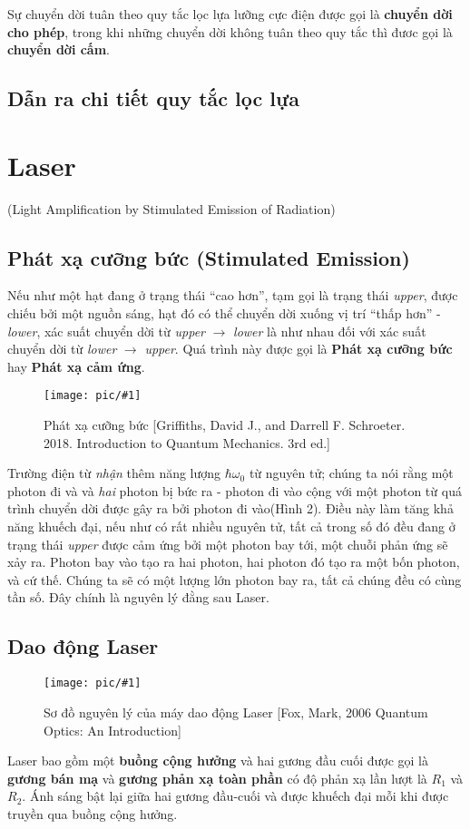\documentclass{article}
\newcommand{\image}[2]{
	\begin{figure}[h!]
		\centering
		\texttt{[image: pic/\#1]}
		\caption{#2}
	\end{figure}
}
\begin{document}
Sự chuyển dời tuân theo quy tắc lọc lựa lưỡng cực điện được gọi là \textbf{chuyển dời cho phép}, trong khi những chuyển dời không tuân theo quy tắc thì đươc gọi là \textbf{chuyển dời cấm}.

\subsection{Dẫn ra chi tiết quy tắc lọc lựa}

\section{Laser}(Light Amplification by
 Stimulated Emission of Radiation)
\subsection{Phát xạ cưỡng bức (Stimulated Emission)}
Nếu như một hạt đang ở trạng thái ``cao hơn'', tạm gọi là trạng thái \textit{upper}, được chiếu bởi một nguồn sáng, hạt đó có thể chuyển dời xuống vị trí ``thấp hơn'' - \textit{lower}, xác suất chuyển dời từ \textit{upper} $\rightarrow$ \textit{lower} là như nhau đối với xác suất chuyển dời từ \textit{lower} $\rightarrow$ \textit{upper}. Quá trình này được gọi là \textbf{Phát xạ cưỡng bức} hay \textbf{Phát xạ cảm ứng}.
\image{stimulatedemission.png}{Phát xạ cưỡng bức [Griffiths, David J., and Darrell F. Schroeter. 2018. Introduction to Quantum Mechanics. 3rd ed.]}

Trường điện từ \textit{nhận} thêm năng lượng $\hbar \omega_0$ từ nguyên tử; chúng ta nói rằng một photon đi và và \textit{hai} photon bị bức ra - photon đi vào cộng với một photon từ quá trình chuyển dời được gây ra bởi photon đi vào(Hình 2). Điều này làm tăng khả năng khuếch đại, nếu như có rất nhiều nguyên tử, tất cả trong số đó đều đang ở trạng thái \textit{upper} được cảm ứng bởi một photon bay tới, một chuỗi phản ứng sẽ xảy ra. Photon bay vào tạo ra hai photon, hai photon đó tạo ra một bốn photon, và cứ thế. Chúng ta sẽ có một lượng lớn photon bay ra, tất cả chúng đều có cùng tần số. Đây chính là nguyên lý đằng sau Laser.
\subsection{Dao động Laser}
\image{fig4.8.png}{Sơ đồ nguyên lý của máy dao động Laser [Fox, Mark, 2006 Quantum Optics: An Introduction]}

Laser bao gồm một \textbf{buồng cộng hưởng} và hai gương đầu cuối được gọi là \textbf{gương bán mạ} và \textbf{gương phản xạ toàn phần} có độ phản xạ lần lượt là $R_1$ và $R_2$. Ánh sáng bật lại giữa hai gương đầu-cuối và được khuếch đại mỗi khi được truyền qua buồng cộng hưởng.
\end{document}
